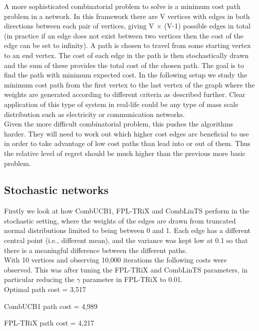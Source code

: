 A more sophisticated combinatorial problem to solve is a minimum cost path problem in a network. In this framework there are V vertices with edges in both directions between each pair of vertices, giving V $\times$ (V-1) possible edges in total (in practice if an edge does not exist between two vertices then the cost of the edge can be set to infinity). A path is chosen to travel from some starting vertex to an end vertex. The cost of each edge in the path is then stochastically drawn and the sum of these provides the total cost of the chosen path. The goal is to find the path with minimum expected cost. In the following setup we study the minimum cost path from the first vertex to the last vertex of the graph where the weights are generated according to different criteria as described further. Clear application of this type of system in real-life could be any type of mass scale distribution such as electricity or communication networks.\\

Given the more difficult combinatorial problem, this pushes the algorithms harder. They will need to work out which higher cost edges are beneficial to use in order to take advantage of low cost paths than lead into or out of them. Thus the relative level of regret should be much higher than the previous more basic problem.\\

\subsection{Stochastic networks}

Firstly we look at how CombUCB1, FPL-TRiX and CombLinTS perform in the stochastic setting, where the weights of the edges are drawn from truncated normal distributions limited to being between 0 and 1. Each edge has a different central point (i.e., different mean), and the variance was kept low at 0.1 so that there is a meaningful difference between the different paths.\\

With 10 vertices and observing 10,000 iterations the following costs were observed. This was after tuning the FPL-TRiX and CombLinTS parameters, in particular reducing the $\gamma$ parameter in FPL-TRiX to 0.01.\\

Optimal path cost = 3,517

CombUCB1 path cost = 4,989

FPL-TRiX path cost = 4,217

